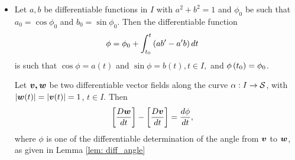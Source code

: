 \documentclass[11pt]{article}
\begin{document}
\begin{itemize}
\item \begin{lemma}\label{lem: diff_angle}
Let $a,b$ be differentiable functions in $I$ with $a^{2}+ b^{2} = 1$ and $\phi_{0}$ be such that $a_{0} = \cos \phi_{0}$ and $b_{0} = \sin \phi_{0}$. Then the differentiable function 
\begin{align*}
\phi &= \phi_{0} + \int_{t_{0}}^{t}\left(ab' - a'b\right)dt
\end{align*}
is such that $\cos \phi = a(t)$ and $\sin \phi = b(t), t\in I,$ and $\phi\left(t_{0}\right) = \phi_{0}$.
\end{lemma}

\begin{lemma} \label{lem: cov_deriv_angle}
Let $\boldsymbol{v,w}$ be two differentiable vector fields along the curve $\alpha: I \rightarrow {\mathcal S}$, with $\left\lvert \boldsymbol{w}(t) \right\rvert = \left\lvert \boldsymbol{v}(t) \right\rvert = 1$, $t\in I$. Then 
\begin{align*}
\left[\frac{D\boldsymbol{w}}{dt}\right] - \left[\frac{D\boldsymbol{v}}{dt}\right] &= \frac{d\phi}{dt},
\end{align*}
where $\phi$ is one of the differentiable determination of the angle from $\boldsymbol{v}$ to $\boldsymbol{w}$, as given in Lemma \ref{lem: diff_angle}
\end{lemma}
\end{itemize}
\end{document}
